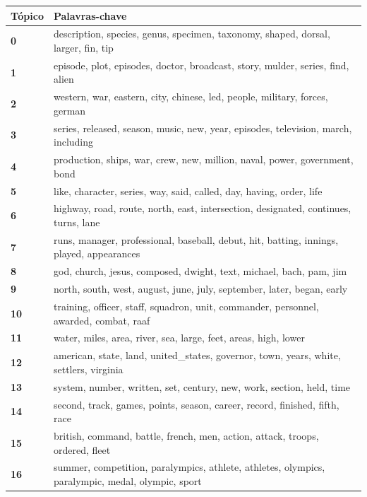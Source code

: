 \begin{table}[htpb]
    \centering
    \scriptsize
    \begin{tabularx}{\textwidth}{@{}l X@{}}
        \toprule
        \textbf{Tópico} & \textbf{Palavras-chave} \\
        \midrule
        \textbf{0} & description, species, genus, specimen, taxonomy, shaped, dorsal, larger, fin, tip \\
        \textbf{1} & episode, plot, episodes, doctor, broadcast, story, mulder, series, find, alien \\
        \textbf{2} & western, war, eastern, city, chinese, led, people, military, forces, german \\
        \textbf{3} & series, released, season, music, new, year, episodes, television, march, including \\
        \textbf{4} & production, ships, war, crew, new, million, naval, power, government, bond \\
        \textbf{5} & like, character, series, way, said, called, day, having, order, life \\
        \textbf{6} & highway, road, route, north, east, intersection, designated, continues, turns, lane \\
        \textbf{7} & runs, manager, professional, baseball, debut, hit, batting, innings, played, appearances \\
        \textbf{8} & god, church, jesus, composed, dwight, text, michael, bach, pam, jim \\
        \textbf{9} & north, south, west, august, june, july, september, later, began, early \\
        \textbf{10} & training, officer, staff, squadron, unit, commander, personnel, awarded, combat, raaf \\
        \textbf{11} & water, miles, area, river, sea, large, feet, areas, high, lower \\
        \textbf{12} & american, state, land, united\_states, governor, town, years, white, settlers, virginia \\
        \textbf{13} & system, number, written, set, century, new, work, section, held, time \\
        \textbf{14} & second, track, games, points, season, career, record, finished, fifth, race \\
        \textbf{15} & british, command, battle, french, men, action, attack, troops, ordered, fleet \\
        \textbf{16} & summer, competition, paralympics, athlete, athletes, olympics, paralympic, medal, olympic, sport \\

\end{tabularx}
\end{table}
